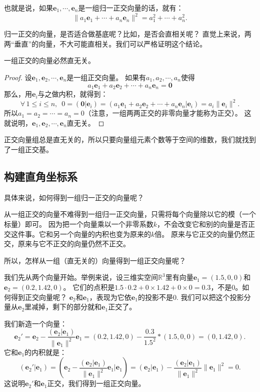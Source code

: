 \documentclass[12pt,UTF8]{ctexbook}
\begin{document}
也就是说，如果$\mathbf{e}_1, \cdots , \mathbf{e}_n$是一组归一正交向量的话，就有：
$$ \|a_1\mathbf{e}_1 + \cdots + a_n\mathbf{e}_n\|^2 = a_1^2 + \cdots + a_n^2.$$

归一正交的向量，是否适合做基底呢？比如，是否会直相关呢？
直觉上来说，两两“垂直”的向量，不大可能直相关。我们可以严格证明这个结论。

\begin{pp}\label{pp:7_4}
    一组正交的向量必然直无关。
\end{pp}

\begin{proof} %
    设$\mathbf{e}_1, \mathbf{e}_2, \cdots , \mathbf{e}_n$是一组正交向量。
    如果有$a_1, a_2, \cdots, a_n$使得
    $$a_1\mathbf{e}_1 + a_2\mathbf{e}_2 + \cdots + a_n \mathbf{e}_n = \mathbf{0}$$
    那么，用$\mathbf{e}_i$与之做内积，就得到：
    $$\forall \, 1 \leqslant i \leqslant n, \,\,\, 0 = (\mathbf{0} |\mathbf{e}_i) = ( a_1\mathbf{e}_1 + a_2\mathbf{e}_2 + \cdots + a_n \mathbf{e}_n | \mathbf{e}_i) = a_i \|\mathbf{e}_i\|^2.$$
    所以$a_1 = a_2 = \cdots = a_n = 0$（注意，一组两两正交的非零向量才能称为正交）。
    这就说明，$\mathbf{e}_1, \mathbf{e}_2, \cdots , \mathbf{e}_n$直无关。
\end{proof}


正交向量组总是直无关的，所以只要向量组元素个数等于空间的维数，我们就找到了一组正交基。

\subsection{构建直角坐标系}
具体来说，如何得到一组归一正交的向量呢？

从一组正交的向量不难得到一组归一正交向量，只需将每个向量除以它的模（一个标量）即可。
因为把一个向量乘以一个非零系数$k$，不会改变它和别的向量是否正交这件事。它和另一个向量的内积也变为原来的$k$倍。
原来与它正交的向量仍然正交，原来与它不正交的向量仍然不正交。

所以，怎样从一组（直无关的）向量得到一组正交向量呢？

我们先从两个向量开始。举例来说，设三维实空间$\mathbb{R}^3$里有向量$\mathbf{e}_1 = (1.5,0,0)$和$\mathbf{e}_2 = (0.2,1.42,0)$。
它们的点积是$1.5\cdot 0.2 + 0\times 1.42 + 0\times 0 = 0.3$，不是0。如何得到正交向量呢？
$\mathbf{e}_2$和$\mathbf{e}_1$，表现为它依$\mathbf{e}_1$的投影不是0. 
我们可以把这个投影分量从$\mathbf{e}_2$里减掉，剩下的部分就和$\mathbf{e}_1$正交了。

我们新造一个向量：
$$ \mathbf{e}_2' = \mathbf{e}_2 - \frac{(\mathbf{e}_2|\mathbf{e}_1)}{\|\mathbf{e}_1\|^2}\mathbf{e}_1 = (0.2,1.42,0) - \frac{0.3}{1.5^2} * (1.5,0,0) = (0, 1.42, 0).$$
它和$\mathbf{e}_1$的内积就是：
$$ (\mathbf{e}_2' | \mathbf{e}_1)= (\mathbf{e}_2 - \frac{(\mathbf{e}_2|\mathbf{e}_1)}{\|\mathbf{e}_1\|^2}\mathbf{e}_1|\mathbf{e}_1) = (\mathbf{e}_2|\mathbf{e}_1) - \frac{(\mathbf{e}_2|\mathbf{e}_1)}{\|\mathbf{e}_1\|^2}\|\mathbf{e}_1\|^2 = 0.$$
这说明$\mathbf{e}_2'$和$\mathbf{e}_1$正交，我们得到一组正交向量。 
\end{document}

